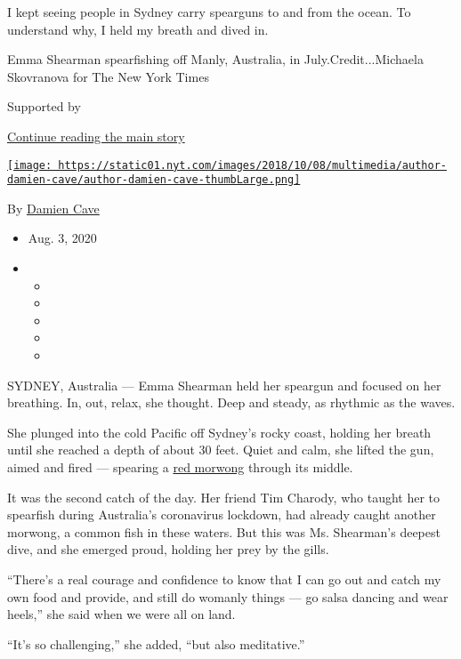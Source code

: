 I kept seeing people in Sydney carry spearguns to and from the ocean. To
understand why, I held my breath and dived in.

Emma Shearman spearfishing off Manly, Australia, in
July.Credit...Michaela Skovranova for The New York Times

Supported by

\protect\hyperlink{after-sponsor}{Continue reading the main story}

\href{https://www.nytimes.com/by/damien-cave}{\texttt{[image: https://static01.nyt.com/images/2018/10/08/multimedia/author-damien-cave/author-damien-cave-thumbLarge.png]}}

By \href{https://www.nytimes.com/by/damien-cave}{Damien Cave}

\begin{itemize}
\item
  Aug. 3, 2020
\item
  \begin{itemize}
  \item
  \item
  \item
  \item
  \item
  \end{itemize}
\end{itemize}

SYDNEY, Australia --- Emma Shearman held her speargun and focused on her
breathing. In, out, relax, she thought. Deep and steady, as rhythmic as
the waves.

She plunged into the cold Pacific off Sydney's rocky coast, holding her
breath until she reached a depth of about 30 feet. Quiet and calm, she
lifted the gun, aimed and fired --- spearing a
\href{https://www.dpi.nsw.gov.au/fishing/fish-species/species-list/red-morwong}{red
morwong} through its middle.

It was the second catch of the day. Her friend Tim Charody, who taught
her to spearfish during Australia's coronavirus lockdown, had already
caught another morwong, a common fish in these waters. But this was Ms.
Shearman's deepest dive, and she emerged proud, holding her prey by the
gills.

``There's a real courage and confidence to know that I can go out and
catch my own food and provide, and still do womanly things --- go salsa
dancing and wear heels,'' she said when we were all on land.

``It's so challenging,'' she added, ``but also meditative.''

